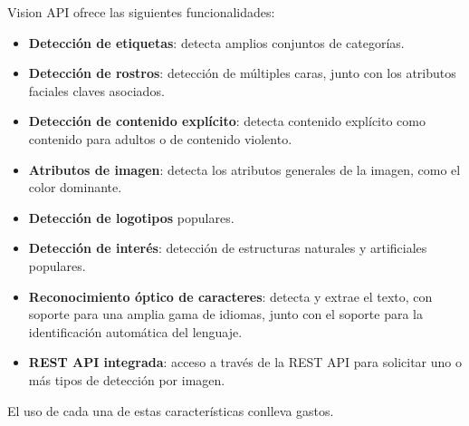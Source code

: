 Vision API ofrece las siguientes funcionalidades:
\begin{itemize}
\item \textbf{Detección de etiquetas}: detecta amplios conjuntos de categorías.
\item \textbf{Detección de rostros}: detección de múltiples caras, junto con los atributos faciales claves asociados.
\item \textbf{Detección de contenido explícito}: detecta contenido explícito como contenido para adultos o de contenido violento.
\item \textbf{Atributos de imagen}: detecta los atributos generales de la imagen, como el color dominante.
\item \textbf{Detección de logotipos} populares.
\item \textbf{Detección de interés}: detección de estructuras naturales y artificiales populares.
\item \textbf{Reconocimiento óptico de caracteres}: detecta y extrae el texto, con soporte para una amplia gama de idiomas, junto con el soporte para la identificación automática del lenguaje.
\item \textbf{REST API integrada}: acceso a través de la REST API para solicitar uno o más tipos de detección por imagen.
\end{itemize}

El uso de cada una de estas características conlleva gastos.


